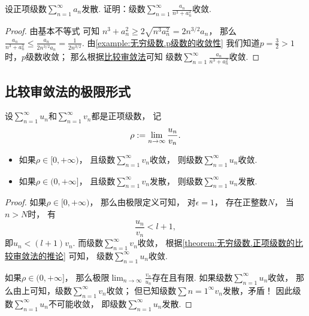 \begin{example}
设正项级数\(\sum_{n=1}^\infty a_n\)发散.
证明：级数\(\sum_{n=1}^\infty \frac{a_n}{n^3+a_n^2}\)收敛.
\begin{proof}
由基本不等式  可知
\(n^3+a_n^2\geq2\sqrt{n^3 a_n^2}=2n^{3/2}a_n\)，
那么\(\frac{a_n}{n^3+a_n^2}\leq\frac{a_n}{2n^{3/2}a_n}=\frac{1}{2n^{3/2}}\).
由\cref{example:无穷级数.p级数的收敛性}
我们知道\(p=\frac{3}{2}>1\)时，\(p\)级数收敛；
那么根据\hyperref[theorem:无穷级数.正项级数的比较审敛法]{比较审敛法}可知
级数\(\sum_{n=1}^\infty \frac{a_n}{n^3+a_n^2}\)收敛.
\end{proof}
\end{example}

\subsection{比较审敛法的极限形式}
\begin{theorem}[比较审敛法的极限形式]\label{theorem:无穷级数.正项级数的比较审敛法的极限形式}
设\(\sum_{n=1}^\infty u_n\)和\(\sum_{n=1}^\infty v_n\)都是正项级数，
记\[
	\rho
	:=
	\lim_{n\to\infty} \frac{u_n}{v_n}.
\]
\begin{itemize}
	\item 如果\(\rho\in[0,+\infty)\)，
	且级数\(\sum_{n=1}^\infty v_n\)收敛，
	则级数\(\sum_{n=1}^\infty u_n\)收敛.

	\item 如果\(\rho\in(0,+\infty]\)，
	且级数\(\sum_{n=1}^\infty v_n\)发散，
	则级数\(\sum_{n=1}^\infty u_n\)发散.
\end{itemize}
\begin{proof}
如果\(\rho\in[0,+\infty)\)，
那么由极限定义可知，
对\(\epsilon=1\)，
存在正整数\(N\)，
当\(n>N\)时，
有\[
	\frac{u_n}{v_n} < l+1,
\]
即\(u_n < (l+1) v_n\).
而级数\(\sum_{n=1}^\infty v_n\)收敛，
根据\cref{theorem:无穷级数.正项级数的比较审敛法的推论} 可知，
级数\(\sum_{n=1}^\infty u_n\)收敛.

如果\(\rho\in(0,+\infty]\)，
那么极限\(\lim_{n\to\infty} \frac{v_n}{u_n}\)存在且有限.
如果级数\(\sum_{n=1}^\infty u_n\)收敛，
那么由上可知，级数\(\sum_{n=1}^\infty v_n\)收敛；
但已知级数\(\sum\limits{n=1}^\infty v_n\)发散，矛盾！
因此级数\(\sum_{n=1}^\infty u_n\)不可能收敛，
即级数\(\sum_{n=1}^\infty u_n\)发散.
\end{proof}
\end{theorem}

